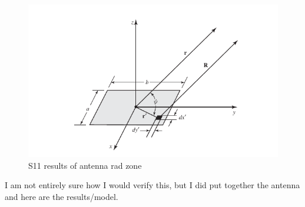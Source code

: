 \documentclass[12pt]{article}
\begin{document}
\begin{center}
\begin{figure}[h]
    \centering
    \includegraphics[width=17cm]{./images/fig6-4c.png}
    \caption{S11 results of antenna rad zone}
    \label{fig:S11_21}
  \end{figure}
\end{center}
I am not entirely sure how I would verify this, but I did put together the antenna and here are the results/model. 
\newpage
\end{document}

